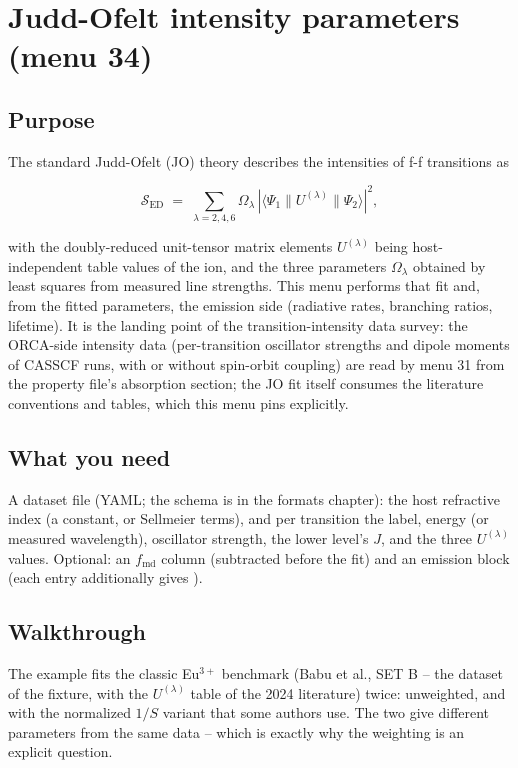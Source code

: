 \chapter{Judd-Ofelt intensity parameters (menu 34)}
\label{ch:menu34}

\section{Purpose}

The standard Judd-Ofelt (JO) theory describes the intensities of f-f
transitions as

\begin{equation}
  \mathcal{S}_{\mathrm{ED}} \; = \; \sum_{\lambda = 2, 4, 6}
    \Omega_\lambda \, \left| \langle \Psi_1 \| U^{(\lambda)} \| \Psi_2
    \rangle \right|^2 ,
\end{equation}

with the doubly-reduced unit-tensor matrix elements $U^{(\lambda)}$ being
host-independent table values of the ion, and the three parameters
$\Omega_\lambda$ obtained by least squares from measured line strengths.
This menu performs that fit and, from the fitted parameters, the emission
side (radiative rates, branching ratios, lifetime).  It is the landing
point of the transition-intensity data survey: the ORCA-side
intensity data (per-transition oscillator strengths and dipole moments of
CASSCF runs, with or without spin-orbit coupling) are read by menu 31 from
the property file's absorption section; the JO fit itself consumes the
literature conventions and tables, which this menu pins explicitly.

\section{What you need}

A dataset file (YAML; the schema is in the formats chapter): the host
refractive index (a constant, or Sellmeier terms), and per transition the
label, energy (or measured wavelength), oscillator strength, the lower
level's $J$, and the three $U^{(\lambda)}$ values.  Optional: an
$f_{\mathrm{md}}$ column (subtracted before the fit) and an emission block
(each entry additionally gives ).

\section{Walkthrough}

The example fits the classic Eu$^{3+}$ benchmark (Babu et al., SET B --
the dataset of the fixture, with the $U^{(\lambda)}$ table of the 2024
literature) twice: unweighted, and with the normalized $1/S$ variant that
some authors use.  The two give different parameters from the same data --
which is exactly why the weighting is an explicit question.

